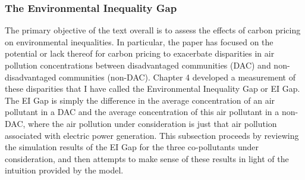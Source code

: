 



\subsubsection*{The Environmental Inequality Gap}

The primary objective of the text overall is to assess the effects of carbon pricing on environmental inequalities. In particular, the paper has focused on the potential or lack thereof for carbon pricing to exacerbate disparities in air pollution concentrations between disadvantaged communities (DAC) and non-disadvantaged communities (non-DAC). Chapter 4 developed a measurement of these disparities that I have called the Environmental Inequality Gap or EI Gap. The EI Gap is simply the difference in the average concentration of an air pollutant in a DAC and the average concentration of this air pollutant in a non-DAC, where the air pollution under consideration is just that air pollution associated with electric power generation. This subsection proceeds by reviewing the simulation results of the EI Gap for the three co-pollutants under consideration, and then attempts to make sense of these results in light of the intuition provided by the model.

